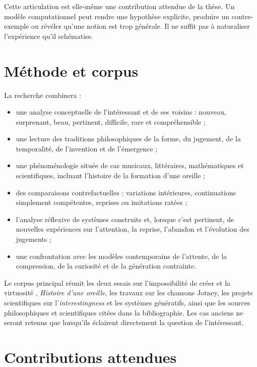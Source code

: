 \documentclass[11pt,a4paper]{article}
\begin{document}
Cette articulation est elle-même une contribution attendue de la thèse. Un
modèle computationnel peut rendre une hypothèse explicite, produire un
contre-exemple ou révéler qu'une notion est trop générale. Il ne suffit pas à
naturaliser l'expérience qu'il schématise.

\section{Méthode et corpus}

La recherche combinera :

\begin{itemize}
  \item une analyse conceptuelle de l'intéressant et de ses voisins : nouveau,
        surprenant, beau, pertinent, difficile, rare et compréhensible ;
  \item une lecture des traditions philosophiques de la forme, du jugement, de
        la temporalité, de l'invention et de l'émergence ;
  \item une phénoménologie située de cas musicaux, littéraires, mathématiques et
        scientifiques, incluant l'histoire de la formation d'une oreille ;
  \item des comparaisons contrefactuelles : variations intérieures,
        continuations simplement compétentes, reprises ou imitations ratées ;
  \item l'analyse réflexive de systèmes construits et, lorsque c'est pertinent,
        de nouvelles expériences sur l'attention, la reprise, l'abandon et
        l'évolution des jugements ;
  \item une confrontation avec les modèles contemporains de l'attente, de la
        compression, de la curiosité et de la génération contrainte.
\end{itemize}

Le corpus principal réunit les deux essais sur l'impossibilité de créer et la
virtuosité \parencite{pachet2026impossibilite,pachet2026virtuosite},
\emph{Histoire d'une oreille}, les travaux sur les chansons Jotney, les projets
scientifiques sur l'\emph{interestingness} et les systèmes génératifs, ainsi que
les sources philosophiques et scientifiques citées dans la bibliographie. Les
cas anciens ne seront retenus que lorsqu'ils éclairent directement la question
de l'intéressant.

\section{Contributions attendues}
\end{document}
